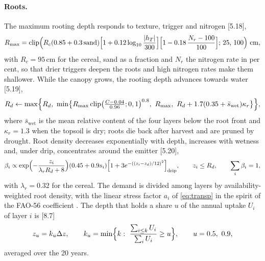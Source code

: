 \documentclass[preprint,12pt]{elsarticle}
\begin{document}
\paragraph{Roots.} The maximum rooting depth responds to texture, trigger and nitrogen [5.18],
\begin{equation}
R_{\max}=\mathrm{clip}\Bigl(R_c(0.85+0.3\,\mathrm{sand})\Bigl[1+0.12\log_{10}\frac{|h_T|}{300}\Bigr]\Bigl[1-0.18\,\frac{N_r-100}{100}\Bigr];\,25,\,100\Bigr)\ \mathrm{cm},
\label{eq:rmax}
\end{equation}
with $R_c=95$\,cm for the cereal, sand as a fraction and $N_r$ the nitrogen rate in per cent, so that drier triggers deepen the roots and high nitrogen rates make them shallower. While the canopy grows, the rooting depth advances towards water [5.19],
\begin{equation}
R_d\leftarrow\max\Bigl\{R_d,\ \min\bigl\{R_{\max}\,\mathrm{clip}\bigl(\tfrac{C-0.04}{0.96};0,1\bigr)^{0.8},\ R_{\max},\ R_d+1.7(0.35+\bar s_{\mathrm{wet}})\kappa_r\bigr\}\Bigr\},
\label{eq:rd}
\end{equation}
where $\bar s_{\mathrm{wet}}$ is the mean relative content of the four layers below the root front and $\kappa_r=1.3$ when the topsoil is dry; roots die back after harvest and are pruned by drought. Root density decreases exponentially with depth, increases with wetness and, under drip, concentrates around the emitter [5.20],
\begin{equation}
\beta_i\propto\exp\Bigl(-\frac{z_i}{\lambda_rR_d+8}\Bigr)(0.45+0.9s_i)\Bigl[1+3e^{-((z_i-z_d)/12)^2}\Bigr]_{\text{drip}},\qquad z_i\le R_d,\qquad \sum_i\beta_i=1,
\label{eq:rootdens}
\end{equation}
with $\lambda_r=0.32$ for the cereal. The demand is divided among layers by availability-weighted root density, with the linear stress factor $a_i$ of \cref{eq:transp} in the spirit of the FAO-56 coefficient \cite{Allen1998,Feddes1978}. The depth that holds a share $u$ of the annual uptake $U_i$ of layer $i$ is [8.7]
\begin{equation}
z_u=k_u\Delta z,\qquad k_u=\min\Bigl\{k:\ \frac{\sum_{i\le k}U_i}{\sum_iU_i}\ge u\Bigr\},\qquad u=0.5,\ 0.9,
\label{eq:zp}
\end{equation}
averaged over the 20 years.
\end{document}
